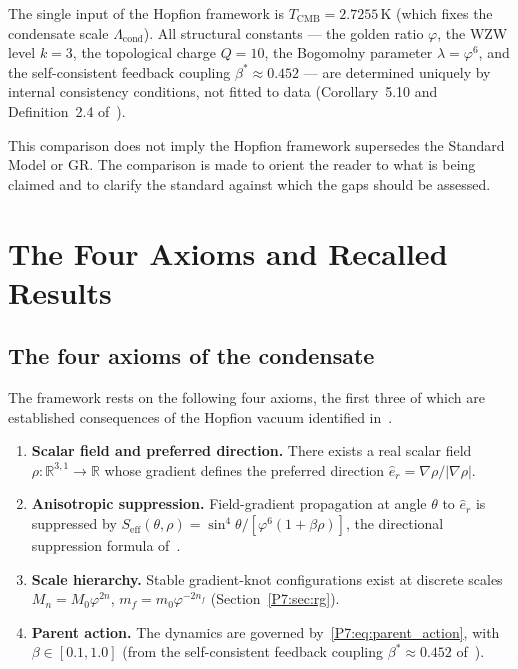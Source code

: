 \documentclass[11pt,a4paper]{article}
\theoremstyle{definition}
\theoremstyle{remark}
\newcommand{\vp}{\varphi}
\newcommand{\bst}{\beta^{*}}
\newcommand{\lam}{\lambda}
\newcommand{\TCMB}{T_{\mathrm{CMB}}}
\newcommand{\Lcond}{\Lambda_{\mathrm{cond}}}
\begin{document}
\smallskip
The single input of the Hopfion framework is $\TCMB = 2.7255\,\mathrm{K}$
(which fixes the condensate scale $\Lcond$).  All structural constants --- the
golden ratio $\vp$, the WZW level $k=3$, the topological charge $Q=10$,
the Bogomolny parameter $\lam=\vp^6$, and the self-consistent feedback
coupling $\bst\approx0.452$ --- are determined uniquely by internal
consistency conditions, not fitted to data
(Corollary~5.10 and Definition~2.4 of~\cite{Paper1}).

This comparison does not imply the Hopfion framework supersedes the
Standard Model or GR. The comparison is made to orient the reader to what is being
claimed and to clarify the standard against which the gaps should
be assessed.

\section{The Four Axioms and Recalled Results}
\label{P7:sec:axioms}

\subsection{The four axioms of the condensate}

The framework rests on the following four axioms, the first three of
which are established consequences of the Hopfion vacuum identified
in~\cite{Paper1}.

\begin{enumerate}[label=\textbf{A\arabic*.},leftmargin=*]

\item \textbf{Scalar field and preferred direction.}
  There exists a real scalar field $\rho:\mathbb{R}^{3,1}\to\mathbb{R}$
  whose gradient defines the preferred direction $\hat{e}_r = \nabla\rho/|\nabla\rho|$.

\item \textbf{Anisotropic suppression.}
  Field-gradient propagation at angle $\theta$ to $\hat{e}_r$ is suppressed
  by $S_{\mathrm{eff}}(\theta,\rho) = \sin^4\!\theta/[\vp^6(1+\beta\rho)]$,
  the directional suppression formula of~\cite{Paper1}.

\item \textbf{Scale hierarchy.}
  Stable gradient-knot configurations exist at discrete scales
  $M_n = M_0\vp^{2n}$, $m_f = m_0\vp^{-2n_f}$ (Section~\ref{P7:sec:rg}).

\item \textbf{Parent action.}
  The dynamics are governed by~\eqref{P7:eq:parent_action}, with
  $\beta\in[0.1,1.0]$ (from the self-consistent feedback coupling
  $\bst\approx0.452$ of~\cite{Paper1}).
\end{enumerate}
\end{document}
